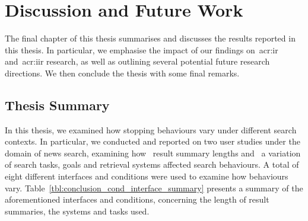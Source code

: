 
\chapter[Discussion and Future Work]{Discussion and Future Work}\label{chap:conclusions}
The final chapter of this thesis summarises and discusses the results reported in this thesis. In particular, we emphasise the impact of our findings on~\gls{acr:ir} and~\gls{acr:iir} research, as well as outlining several potential future research directions. We then conclude the thesis with some final remarks.

\section{Thesis Summary}\label{sec:conclusions:summary}
In this thesis, we examined how stopping behaviours vary under different search contexts. In particular, we conducted and reported on two user studies under the domain of news search, examining how~ result summary lengths and~ a variation of search tasks, goals and retrieval systems affected search behaviours. A total of eight different interfaces and conditions were used to examine how behaviours vary. Table~\ref{tbl:conclusion_cond_interface_summary} presents a summary of the aforementioned interfaces and conditions, concerning the length of result summaries, the systems and tasks used.

